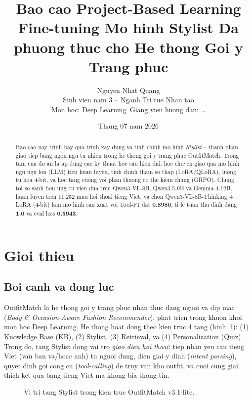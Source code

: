 \documentclass[12pt,a4paper]{article}
\title{\textbf{Bao cao Project-Based Learning}\\
{\large Fine-tuning Mo hinh Stylist Da phuong thuc cho He thong Goi y Trang phuc}}
\author{Nguyen Nhat Quang\\
Sinh vien nam 3 -- Nganh Tri tue Nhan tao\\
Mon hoc: Deep Learning\ Giang vien huong dan: \ldots}
\date{Thang 07 nam 2026}
\begin{document}
\maketitle
\begin{abstract}
Bao cao nay trinh bay qua trinh xay dung va tinh chinh mo hinh \emph{Stylist} -- thanh phan
giao tiep bang ngon ngu tu nhien trong he thong goi y trang phuc OutfitMatch. Trong tam cua
do an la ap dung cac ky thuat hoc sau hien dai: hoc chuyen giao qua mo hinh ngu ngu lon
(LLM) tien huan luyen, tinh chinh tham so thap (LoRA/QLoRA), luong tu hoa 4-bit, va hoc tang
cuong voi phan thuong co the kiem chung (GRPO). Chung toi so sanh bon ung cu vien dua tren
Qwen3-VL-8B, Qwen3.5-9B va Gemma-4-12B, huan luyen tren 11.252 mau hoi thoai tieng Viet,
va chon Qwen3-VL-8B-Thinking + LoRA (4-bit) lam mo hinh san xuat voi Tool-F1 dat
\textbf{0.8980}, ti le tuan thu dinh dang \textbf{1.0} va eval loss \textbf{0.5943}.
\end{abstract}
\tableofcontents
\newpage
\section{Gioi thieu}
\label{sec:intro}
\subsection{Boi canh va dong luc}
OutfitMatch la he thong goi y trang phuc nhan thuc dang nguoi va dip mac
(\emph{Body \& Occasion-Aware Fashion Recommender}), phat trien trong khuon khoi mon hoc
Deep Learning. He thong hoat dong theo kien truc 4 tang (hinh~\ref{fig:arch}):
(1) Knowledge Base (KB), (2) Stylist, (3) Retrieval, va (4) Personalization (Quiz).
Trong do, tang Stylist dong vai tro \emph{giao dien hoi thoai}: tiep nhan yeu cau tieng
Viet (van ban va/hoac anh) tu nguoi dung, dien giai y dinh (\emph{intent parsing}), quyet
dinh goi cong cu (\emph{tool-calling}) de truy van kho outfit, va cuoi cung giai thich ket
qua bang tieng Viet ma khong bia thong tin.
\begin{figure}[H]
  \centering
  \caption{Vi tri tang Stylist trong kien truc OutfitMatch v3.1-lite.}
  \label{fig:arch}
\end{figure}
\end{document}
